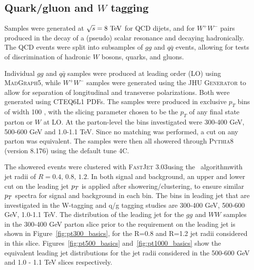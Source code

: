 \subsection{Quark/gluon and $W$ tagging}

Samples were generated at $\sqrt{s} = 8\TeV$ for QCD dijets, and for $W^+W^-$
pairs produced in the decay of a (pseudo) scalar resonance and
decaying hadronically. The QCD events
were split into subsamples of $gg$ and $q\bar{q}$ events, allowing for tests of
discrimination of hadronic $W$ bosons, quarks, and gluons.

Individual $gg$ and $q\bar{q}$ samples were produced at leading order (LO)
using \textsc{MadGraph5}, while $W^+W^-$ samples were generated using
the \textsc{JHU Generator} to allow for separation of longitudinal and
transverse polarizations. Both were generated using \textsc{CTEQ6L1}
PDFs. The samples were produced in exclusive $p_T$ bins
of width 100 {\GeV}, with the slicing parameter
chosen to be the $p_T$ of any final state parton or $W$ at LO. At the
parton-level the \pt bins investigated were 300-400 GeV, 500-600 GeV
and 1.0-1.1 TeV. Since
no matching was performed, a cut on any parton was equivalent. The samples were
then all showered through \textsc{Pythia8} (version 8.176) using the default tune 4C.

The showered events were clustered with \textsc{FastJet}
3.03 using
the \antikt~algorithm with jet radii of $R = 0.4,\, 0.8,\, 1.2$. In
both signal and background, an upper and lower cut on
the leading jet $p_T$ is applied after showering/clustering, to ensure
similar $p_T$ spectra for signal and background in each \pt bin. The bins
in leading jet \pt that are investigated in the W-tagging and
q/g tagging studies are 300-400 GeV, 500-600 GeV, 1.0-1.1 TeV. The
distribution of the leading jet \pt for the $gg$ and $WW$ samples in
the 300-400 GeV parton \pt slice prior to the requirement on the
leading jet \pt is shown in Figure~\ref{fig:pt300_basics}, for the
R=0.8 and R=1.2 \antikt jet radii considered in this
\pt slice. Figures~\ref{fig:pt500_basics} and~\ref{fig:pt1000_basics}
show the equivalent leading jet \pt distributions for the jet radii
considered in the 500-600 GeV and 1.0 - 1.1 TeV slices respectively.

